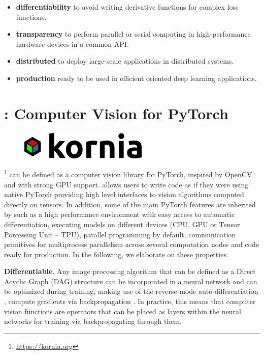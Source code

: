 \begin{itemize}
	\item \textbf{differentiability} to avoid writing derivative functions for complex loss functions.
	\item \textbf{transparency} to perform parallel or serial computing in high-performance hardware devices in a common API.
	\item \textbf{distributed} to deploy large-scale applications in distributed systems.
	\item \textbf{production} ready to be used in efficient oriented deep learning applications.
\end{itemize}

\newpage

\section{\lib: Computer Vision for PyTorch}
\label{section:kornia}

\begin{figure}[h]
\centering
\includegraphics[scale=0.30]{main/chapter03/data/kornia_logo.png}
\label{fig:kornia_logo}
\end{figure}

\lib\footnote{\url{https://kornia.org}} can be defined as a computer vision library for PyTorch, inspired by OpenCV and with strong GPU support. \lib{} allows users to write code as if they were using native PyTorch providing high level interfaces to vision algorithms computed directly on tensors. In addition, some of the main PyTorch features are inherited by \lib{} such as a high performance environment with easy access to automatic differentiation, executing models on different devices (CPU, GPU or Tensor Porcessing Unit -- TPU), parallel programming by default, communication primitives for multiprocess parallelism across several computation nodes and code ready for production. In the following, we elaborate on these properties.

\textbf{Differentiable}. Any image processing algorithm that can be defined as a Direct Acyclic Graph (DAG) structure can be incorporated in a neural network and can be optimized during training, making use of the reverse-mode \citep{Speelpenning1980CFP} auto-differentiation \citep{Griewank:2008:EDP:1455489}, compute gradients via backpropagation \citep{kelley1960gradient}. In practice, this means that computer vision functions are operators that can be placed as layers within the neural networks for training via backpropagating through them.

